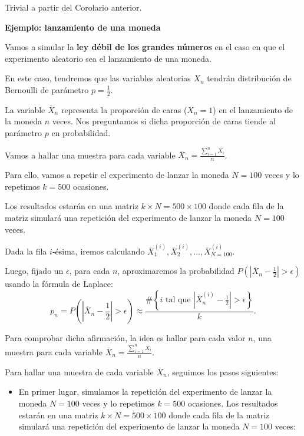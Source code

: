 \documentclass[]{book}
\providecommand{\tightlist}{%
  \setlength{\itemsep}{0pt}\setlength{\parskip}{0pt}}
\begin{document}
Trivial a partir del Corolario anterior.

\textbf{Ejemplo: lanzamiento de una moneda}

Vamos a simular la \textbf{ley débil de los grandes números} en el caso en que el experimento aleatorio sea el lanzamiento de una moneda.

En este caso, tendremos que las variables aleatorias \(X_n\) tendrán distribución de Bernoulli de parámetro \(p=\frac{1}{2}\).

La variable \(\overline{X}_n\) representa la proporción de caras (\(X_n=1\)) en el lanzamiento de la moneda \(n\) veces. Nos preguntamos si dicha proporción de caras tiende al parámetro \(p\) en probabilidad.

Vamos a hallar una muestra para cada variable \(\overline{X}_n=\frac{\sum\limits_{i=1}^n X_i}{n}\).

Para ello, vamos a repetir el experimento de lanzar la moneda \(N=100\) veces y lo repetimos \(k=500\) ocasiones.

Los resultados estarán en una matriz \(k\times N =500\times 100\) donde cada fila de la matriz simulará una repetición del experimento de lanzar la moneda \(N=100\) veces.

Dada la fila \(i\)-ésima, iremos calculando \(\overline{X}_1^{(i)},\overline{X}_2^{(i)},\ldots,\overline{X}_{N=100}^{(i)}\).

Luego, fijado un \(\epsilon\), para cada \(n\), aproximaremos la probabilidad \(P\left(\left|\overline{X}_n-\frac{1}{2}\right|>\epsilon\right)\) usando la fórmula de Laplace:
\[
p_n=P\left(\left|\overline{X}_n-\frac{1}{2}\right|>\epsilon\right) \approx\frac{\#\left\{\mbox{$i$ tal que  $\left|\overline{X}_n^{(i)}-\frac{1}{2}\right|>\epsilon$}\right\}}{k}.
\]

Para comprobar dicha afirmación, la idea es hallar para cada valor \(n\), una muestra para cada variable \(\overline{X}_n=\frac{\sum\limits_{i=1}^n X_i}{n}\).

Para hallar una muestra de cada variable \(\overline{X}_n\), seguimos los pasos siguientes:

\begin{itemize}
\tightlist
\item
  En primer lugar, simulamos la repetición del experimento de lanzar la moneda \(N=100\) veces y lo repetimos \(k=500\) ocasiones.
  Los resultados estarán en una matriz \(k\times N =500\times 100\) donde cada fila de la matriz simulará una repetición del experimento de lanzar la moneda \(N=100\) veces:
\end{itemize}
\end{document}
